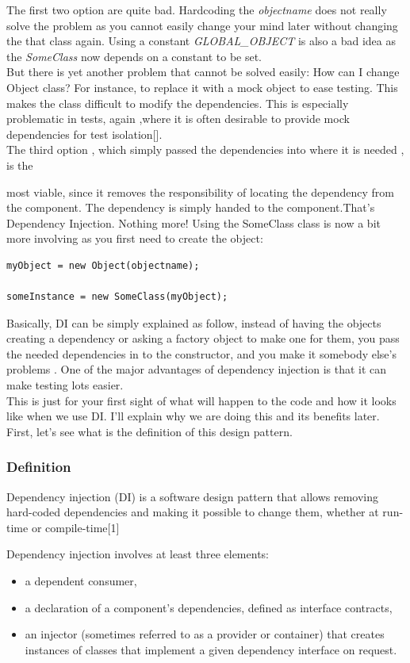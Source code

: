 \documentclass[14pt,a4paper]{extreport}
\begin{document}
The first two option are quite bad. Hardcoding the \emph{objectname} does not really solve the problem as you cannot easily change your mind later without changing the that class again. Using a constant \emph{GLOBAL\_OBJECT} is also a bad idea as the \emph{SomeClass} now depends on a constant to be set.
\\

But there is yet another problem that cannot be solved easily: How can I change Object class? For instance, to replace it with a mock object to ease testing. This makes the class difficult to modify the dependencies. This is especially problematic in tests, again ,where it is often desirable to provide mock dependencies for test isolation[].
\\

The third option , which simply passed the dependencies into where it is needed , is the 

most viable, since it removes the responsibility of locating the dependency from the component. The dependency is simply handed to the component.That's Dependency Injection. Nothing more! Using the SomeClass class is now a bit more 
involving as you first need to create the object:
\begin{verbatim}
myObject = new Object(objectname);

someInstance = new SomeClass(myObject);
\end{verbatim}
Basically, DI can be simply explained as follow, instead of having the objects creating a dependency or asking a factory object to make one for them, you pass the needed dependencies in to the constructor, and you make it somebody else's problems . One of the major advantages of dependency injection is that it can make testing lots easier. 
\\

This is just for your first sight of what will happen to the code and how it looks like when we use DI. I’ll explain why we are doing this and its benefits later. First, let’s see what is the definition of this design pattern.

			\subsubsection{Definition}
			Dependency injection (DI) is a software design pattern that allows removing hard-coded dependencies and making it possible to change them, whether at run-time or compile-time[1]

Dependency injection involves at least three elements:
\begin{itemize}
\item a dependent consumer,
\item a declaration of a component's dependencies, defined as interface contracts,
\item an injector (sometimes referred to as a provider or container) that creates instances of classes that implement a given dependency interface on request.
\end{itemize}
\end{document}

